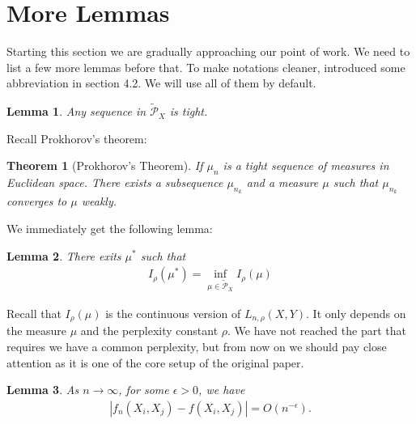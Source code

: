 \documentclass[10pt]{article}
\newtheorem{lemma}{\bf Lemma}
\newtheorem*{theorem*}{Theorem}
\newenvironment{Proof of lemma}{\noindent{\bf Proof of Lemma}}{\hfill$\Box$\newline}
\newenvironment{Proof of claim}{\noindent{\bf Proof of claim}}{\hfill$\Box$\newline}
\newenvironment{Proof of theorem}{\noindent{\bf Proof of Theorem}}{\hfill\scriptsize{$\Box$}\newline}
\newenvironment{Proof of theorems}{\noindent{\bf Proof of Theorems}}{\hfill$\Box$\newline}
\newenvironment{Proof of proposition}{\noindent{\bf Proof of Proposition}}{\hfill$\Box$\newline}
\newenvironment{Proof of propositions}{\noindent{\bf Proof of Propositions}}{\hfill$\Box$\newline}
\newenvironment{Proof of exercise}{\noindent{\it Proof of Exercise:}}{\hfill$\Box$}
\numberwithin{equation}{section}
\begin{document}
\section{More Lemmas}
Starting this section we are gradually approaching our point of work. We need
to list a few more lemmas before that. To make notations cleaner,
\cite{auffinger-tsne} introduced some abbreviation in section 4.2. We will use
all of them by default.
\begin{lemma}
    Any sequence in $\tilde{\mathcal{P}}_X$ is tight.
\end{lemma}
Recall Prokhorov's theorem:
\begin{theorem*}[Prokhorov's Theorem]
    If $\mu_n$ is a tight sequence of measures in Euclidean space. There exists a subsequence $\mu_{n_k}$ and a measure $\mu$ such that $\mu_{n_k}$ converges to $\mu$ weakly.
\end{theorem*}
We immediately get the following lemma:
\begin{lemma} \label{mu_star_lemma}
    There exits $\mu^*$ such that
    \begin{align}
        I_{\rho}(\mu^*) = \inf_{\mu \in \tilde{\mathcal{P}}_X} I_{\rho}(\mu)
    \end{align}
\end{lemma}
Recall that $I_{\rho}(\mu)$ is the continuous version of $L_{n,\rho}(X,Y)$. It only depends on the measure $\mu$ and the perplexity constant $\rho$. We have not reached the part that requires we have a common perplexity, but from now on we should pay close attention as it is one of the core setup of the original paper.
\begin{lemma}
    As $n \to \infty$, for some $\epsilon>0$, we have
    \begin{align}
        |f_n(X_i,X_j)-f(X_i,X_j)| = O(n^{-\epsilon}).
    \end{align}
\end{lemma}
\end{document}

